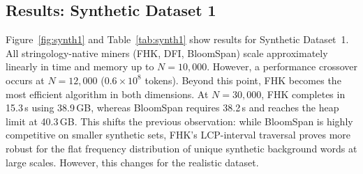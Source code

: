 \documentclass[runningheads]{llncs}
\begin{document}
    \begin{table}[!tbp]
        \caption{Characterisation of Gutenberg-8k subsets. TTR = type/token ratio.}
        \begin{center}
            \label{tab:gut_subsets}
        \end{center}
    \end{table}

    \subsection{Results: Synthetic Dataset 1}

    Figure~\ref{fig:synth1} and Table~\ref{tab:synth1} show results for Synthetic Dataset~1.
    All stringology-native miners (FHK, DFI, BloomSpan) scale approximately linearly in time and memory up to $N = 10{,}000$.
    However, a performance crossover occurs at $N = 12{,}000$ ($0.6 \times 10^8$ tokens).
    Beyond this point, FHK becomes the most efficient algorithm in both dimensions.
    At $N = 30{,}000$, FHK completes in 15.3\,s using 38.9\,GB, whereas BloomSpan requires 38.2\,s and reaches the heap limit at 40.3\,GB.
    This shifts the previous observation: while BloomSpan is highly competitive on smaller synthetic sets, FHK's LCP-interval traversal proves more robust for the flat frequency distribution of unique synthetic background words at large scales. However, this changes for the realistic dataset.
\end{document}
